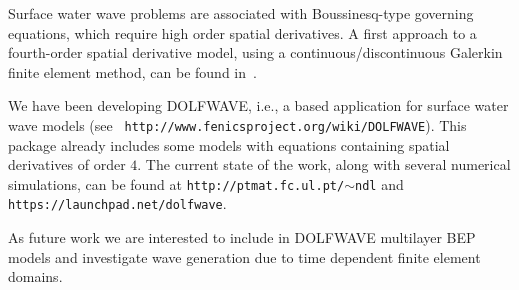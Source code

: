 Surface water wave problems are associated with
Boussinesq-type governing equations, which require high
order spatial derivatives. A first approach to a
fourth-order spatial derivative model, using a
continuous/discontinuous Galerkin finite element method, can
be found in~\cite{LopesPereiraTrabucho}.

We have been developing DOLFWAVE, i.e., a \fenics based
application for surface water wave models (see {\tt
http://www.fenicsproject.org/wiki/DOLFWAVE}).  This package
already includes some models with equations containing
spatial derivatives of order $4$.  The current state of the
work, along with several nume\-ri\-cal simulations, can be found
at {\tt http://ptmat.fc.ul.pt/$\sim$ndl} and {\tt
https://launchpad.net/dolfwave}.

As future work we are interested to include in DOLFWAVE
multilayer BEP models and investigate wave generation due to
time dependent finite element domains.

